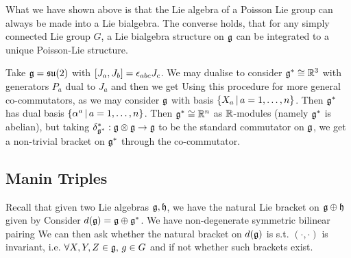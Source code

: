 \documentclass{article}
\begin{document}
\begin{remark}
What we have shown above is that the Lie algebra of a Poisson Lie group can always be made into a Lie bialgebra. The converse holds, that for any simply connected Lie group $G$, a Lie bialgebra structure on $\mf{g}$ can be integrated to a unique Poisson-Lie structure. 
\end{remark}

\begin{example}
Take $\mf{g} = \mf{su}(2)$ with $\comm[J_a]{J_b} = \eps_{abc}J_c$. We may dualise to consider $\mf{g}^\ast \cong \mbb{R}^3$ with generators $P_a$ dual to $J_a$ and then we get 
Using this procedure for more general co-commutators, as we may consider $\mf{g}$ with basis $\pbrace{X_a \, | \, a=1, \dots, n}$. Then $\mf{g}^\ast$ has dual basis $\pbrace{\alpha^a \, | \, a=1, \dots, n}$. Then $\mf{g}^\ast\cong\mbb{R}^n$ as $\mbb{R}$-modules (namely $\mf{g}^\ast$ is abelian), but taking $\delta_{\mf{g}^\ast}^\ast : \mf{g} \otimes \mf{g} \to \mf{g}$ to be the standard commutator on $\mf{g}$, we get a non-trivial bracket on $\mf{g}^\ast$ through the co-commutator. 
\end{example}

\subsection{Manin Triples}
Recall that given two Lie algebras $\mf{g}, \mf{h}$, we have the natural Lie bracket on $\mf{g} \oplus \mf{h}$ given by 
Consider $d(\mf{g}) = \mf{g} \oplus \mf{g}^\ast$. We have non-degenerate symmetric bilinear pairing 
We can then ask whether the natural bracket on $d(\mf{g})$ is s.t. $(\cdot,\cdot)$ is invariant, i.e. $\forall X,Y,Z \in \mf{g}, \, g \in G$
and if not whether such brackets exist. 
\end{document}
